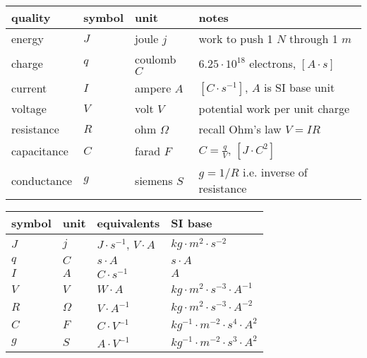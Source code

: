 \begin{table*}[htp!]
    \begin{center}

    \begin{tabular}{llll}
        \hline
        quality & symbol & unit  & notes \\
        \hline
        energy     & $J$ & joule   $j$  & work to push 1 $N$ through 1 $m$ \\
        charge     & $q$ & coulomb $C$  & $6.25\cdot10^{18}$ electrons, $[A\cdot s]$ \\
        current    & $I$ & ampere  $A$  & $[C\cdot s^{-1}]$, $A$ is SI base unit\\
        voltage    & $V$ & volt    $V$  & potential work per unit charge \\
        resistance & $R$ & ohm $\Omega$ & recall Ohm's law $V=IR$ \\
        capacitance& $C$ & farad   $F$  & $C=\frac{q}{V}$, $[J\cdot C^{2}]$\\
        conductance& $g$ & siemens $S$  & $g=1/R$ i.e. inverse of resistance \\
        \hline
    \end{tabular}

    \vspace{20pt}

    \begin{tabular}{llll}
        \hline
        symbol & unit & equivalents & SI base \\
        \hline
        $J$    & $j$      &  $J\cdot s^{-1}$, $V\cdot A$ &
            $kg\cdot m^{2}\cdot s^{-2}$ \\

        $q$    & $C$      & $s\cdot A$ &
            $s\cdot A$ \\

        $I$    & $A$  & $C\cdot s^{-1}$ &
            $A$ \\

        $V$    & $V$      & $W\cdot A$ &
            $kg\cdot m^{2}\cdot s^{-3}\cdot A^{-1}$ \\

        $R$    & $\Omega$ & $V\cdot A^{-1}$ &
            $kg\cdot m^{2}\cdot s^{-3}\cdot A^{-2}$ \\

        $C$    & $F$      & $C\cdot V^{-1}$  &
            $kg^{-1}\cdot m^{-2}\cdot s^{4}\cdot A^{2}$ \\
        $g$    & $S$      & $A\cdot V^{-1}$  &
            $kg^{-1}\cdot m^{-2}\cdot s^3\cdot A^2$ \\
        \hline
    \end{tabular}

    \end{center}
    \caption{Symbols and quantities.}
\end{table*}

